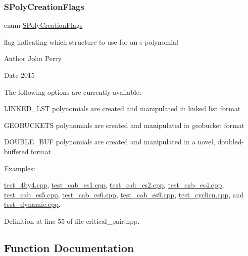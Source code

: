\subsubsection{\texorpdfstring{S\+Poly\+Creation\+Flags}{SPolyCreationFlags}}
{\footnotesize\ttfamily enum \hyperlink{group___g_b_computation_ga73257b8a2d5cc826853a71b77d0cebf2}{S\+Poly\+Creation\+Flags}\hspace{0.3cm}{\ttfamily [strong]}}



flag indicating which structure to use for an s-\/polynomial 

\begin{DoxyAuthor}{Author}
John Perry 
\end{DoxyAuthor}
\begin{DoxyDate}{Date}
2015
\end{DoxyDate}
The following options are currently available\+:
\begin{DoxyItemize}
\item L\+I\+N\+K\+E\+D\+\_\+\+L\+ST polynomials are created and manipulated in linked list format
\item G\+E\+O\+B\+U\+C\+K\+E\+TS polynomials are created and manipulated in geobucket format \cite{YanGeobuckets}
\item D\+O\+U\+B\+L\+E\+\_\+\+B\+UF polynomials are created and manipulated in a novel, doubled-\/buffered format 
\end{DoxyItemize}\begin{Desc}
\item[Examples\+: ]\par
\hyperlink{test_4by4_8cpp-example}{test\+\_\+4by4.\+cpp}, \hyperlink{test_cab_es1_8cpp-example}{test\+\_\+cab\+\_\+es1.\+cpp}, \hyperlink{test_cab_es2_8cpp-example}{test\+\_\+cab\+\_\+es2.\+cpp}, \hyperlink{test_cab_es4_8cpp-example}{test\+\_\+cab\+\_\+es4.\+cpp}, \hyperlink{test_cab_es5_8cpp-example}{test\+\_\+cab\+\_\+es5.\+cpp}, \hyperlink{test_cab_es6_8cpp-example}{test\+\_\+cab\+\_\+es6.\+cpp}, \hyperlink{test_cab_es9_8cpp-example}{test\+\_\+cab\+\_\+es9.\+cpp}, \hyperlink{test_cyclicn_8cpp-example}{test\+\_\+cyclicn.\+cpp}, and \hyperlink{test_dynamic_8cpp-example}{test\+\_\+dynamic.\+cpp}.\end{Desc}


Definition at line 55 of file critical\+\_\+pair.\+hpp.



\subsection{Function Documentation}
\mbox{\label{group___g_b_computation_ga37aa7e2fec96fac6c914934a4243f603}} 
